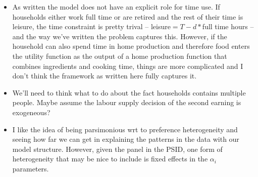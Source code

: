 \documentclass[12pt]{article}
\begin{document}
\begin{itemize}
\item As written the model does not have an explicit role for time use. If households either work full time or are retired and the rest of their time is leisure, the time constraint is pretty trival -- leisure$=T-d*$full time hours -- and the way we've written the problem captures this. However, if the household can also spend time in home production and therefore food enters the utility function as the output of a home production function that combines ingredients and cooking time, things are more complicated and I don't think the framework as written here fully captures it.
\item We'll need to think what to do about the fact households contains multiple people. Maybe assume the labour supply decision of the second earning is exogeneous?
\item I like the idea of being parsimonious wrt to preference heterogeneity and seeing how far we can get in explaining the patterns in the data with our model structure. However, given the panel in the PSID, one form of heterogeneity that may be nice to include is fixed effects in the $\alpha_i$ parameters. 
\end{itemize}
\end{document}
